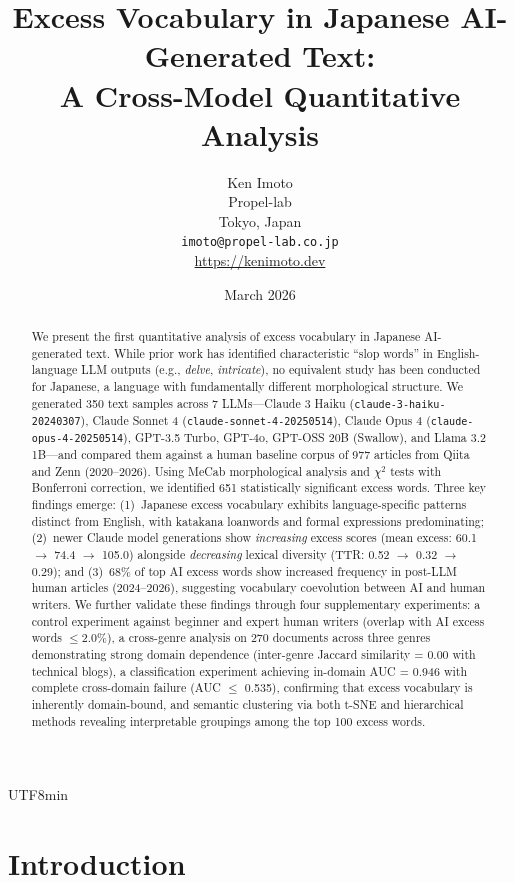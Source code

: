 \documentclass[11pt,a4paper]{article}
\title{Excess Vocabulary in Japanese AI-Generated Text:\\A Cross-Model Quantitative Analysis}
\author{Ken Imoto\\Propel-lab\\Tokyo, Japan\\\texttt{imoto@propel-lab.co.jp}\\\url{https://kenimoto.dev}}
\date{March 2026}
\begin{document}
\begin{CJK}{UTF8}{min}

\maketitle

\begin{abstract}
We present the first quantitative analysis of excess vocabulary in Japanese AI-generated text. While prior work has identified characteristic ``slop words'' in English-language LLM outputs (e.g., \textit{delve}, \textit{intricate}), no equivalent study has been conducted for Japanese, a language with fundamentally different morphological structure. We generated 350 text samples across 7 LLMs---Claude 3 Haiku (\texttt{claude-3-haiku-20240307}), Claude Sonnet 4 (\texttt{claude-sonnet-4-20250514}), Claude Opus 4 (\texttt{claude-opus-4-20250514}), GPT-3.5 Turbo, GPT-4o, GPT-OSS 20B (Swallow), and Llama 3.2 1B---and compared them against a human baseline corpus of 977 articles from Qiita and Zenn (2020--2026). Using MeCab morphological analysis and $\chi^2$ tests with Bonferroni correction, we identified 651 statistically significant excess words. Three key findings emerge: (1)~Japanese excess vocabulary exhibits language-specific patterns distinct from English, with katakana loanwords and formal expressions predominating; (2)~newer Claude model generations show \emph{increasing} excess scores (mean excess: 60.1 $\to$ 74.4 $\to$ 105.0) alongside \emph{decreasing} lexical diversity (TTR: 0.52 $\to$ 0.32 $\to$ 0.29); and (3)~68\% of top AI excess words show increased frequency in post-LLM human articles (2024--2026), suggesting vocabulary coevolution between AI and human writers. We further validate these findings through four supplementary experiments: a control experiment against beginner and expert human writers (overlap with AI excess words $\leq$2.0\%), a cross-genre analysis on 270 documents across three genres demonstrating strong domain dependence (inter-genre Jaccard similarity = 0.00 with technical blogs), a classification experiment achieving in-domain AUC = 0.946 with complete cross-domain failure (AUC $\leq$ 0.535), confirming that excess vocabulary is inherently domain-bound, and semantic clustering via both t-SNE and hierarchical methods revealing interpretable groupings among the top 100 excess words.
\end{abstract}

\section{Introduction}


\end{CJK}
\end{document}
